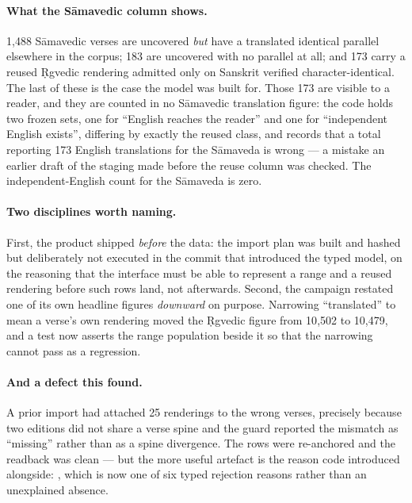 

\paragraph{What the S\=amavedic column shows.} 1{,}488 S\=amavedic verses are
uncovered \emph{but} have a translated identical parallel elsewhere in the corpus;
183 are uncovered with no parallel at all; and 173 carry a reused \d{R}gvedic
rendering admitted only on Sanskrit verified character-identical. The last of these
is the case the model was built for. Those 173 are visible to a reader, and they are
counted in no S\=amavedic translation figure: the code holds two frozen sets, one for
``English reaches the reader'' and one for ``independent English exists'', differing
by exactly the reused class, and records that a total reporting 173 English
translations for the S\=amaveda is wrong --- a mistake an earlier draft of the
staging made before the reuse column was checked. The independent-English count for
the S\=amaveda is zero.

\paragraph{Two disciplines worth naming.} First, the product shipped \emph{before}
the data: the import plan was built and hashed but deliberately not executed in the
commit that introduced the typed model, on the reasoning that the interface must be
able to represent a range and a reused rendering before such rows land, not
afterwards. Second, the campaign restated one of its own headline figures
\emph{downward} on purpose. Narrowing ``translated'' to mean a verse's own rendering
moved the \d{R}gvedic figure from 10{,}502 to 10{,}479, and a test now asserts the
range population beside it so that the narrowing cannot pass as a regression.

\paragraph{And a defect this found.} A prior import had attached 25 renderings to the
wrong verses, precisely because two editions did not share a verse spine and the
guard reported the mismatch as ``missing'' rather than as a spine divergence. The
rows were re-anchored and the readback was clean --- but the more useful artefact is
the reason code introduced alongside:
, which is now one of six typed
rejection reasons rather than an unexplained absence.
